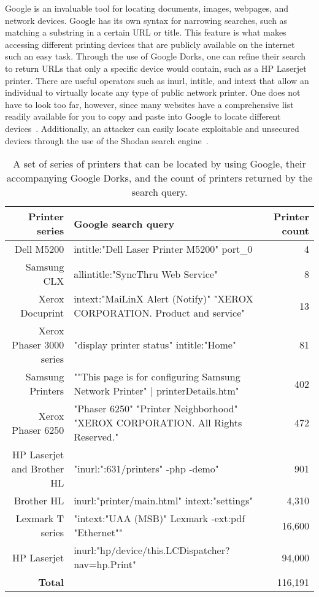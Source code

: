 Google is an invaluable tool for locating documents, images, webpages, and network devices.
Google has its own syntax for narrowing searches, such as matching a substring in a certain URL or title.
This feature is what makes accessing different printing devices that are publicly available on the internet such an easy task.
Through the use of Google Dorks, one can refine their search to return URLs that only a specific device would contain, such as a HP Laserjet printer.
There are useful operators such as inurl, intitle, and intext that allow an individual to virtually locate any type of public network printer.
One does not have to look too far, however, since many websites have a comprehensive list readily available for you to copy and paste into Google to locate different devices~\cite{exploit_db}.
Additionally, an attacker can easily locate exploitable and unsecured devices through the use of the Shodan search engine~\cite{shodan}.

\begin{table*}
    \centering
\label{printer_dorks}
\begin{tabular}{r| p{9cm} | r}
    \hline
    \hline
    {\bf Printer series} & {\bf Google search query} & {\bf Printer count} \\
    \hline    
    Dell M5200 & intitle:"Dell Laser Printer M5200" port\_0 & 4 \\
    \hline
    Samsung CLX & allintitle:"SyncThru Web Service" & 8 \\
    \hline
    Xerox Docuprint & intext:"MaiLinX Alert (Notify)" "XEROX CORPORATION. Product and service" & 13 \\
    \hline
    Xerox Phaser 3000 series & "display printer status" intitle:"Home" & 81 \\
    \hline
    Samsung Printers & ""This page is for configuring Samsung Network Printer" | printerDetails.htm" & 402 \\
    \hline
    Xerox Phaser 6250 & "Phaser 6250" "Printer Neighborhood" "XEROX CORPORATION. All Rights Reserved." & 472 \\
    \hline
    HP Laserjet and Brother HL & "inurl:":631/printers" -php -demo" & 901 \\
    \hline
    Brother HL & inurl:"printer/main.html" intext:"settings" & 4,310 \\
    \hline
    Lexmark T series & "intext:"UAA (MSB)"  Lexmark -ext:pdf "Ethernet"" & 16,600 \\
    \hline
    HP Laserjet & inurl:"hp/device/this.LCDispatcher?nav=hp.Print" & 94,000 \\
    \hline
    \hline
    {\bf Total} & & 116,191 \\
    \hline
\end{tabular}
\caption{A set of series of printers that can be located by using Google, their accompanying Google Dorks, and the count of printers returned by the search query.}
\end{table*}
